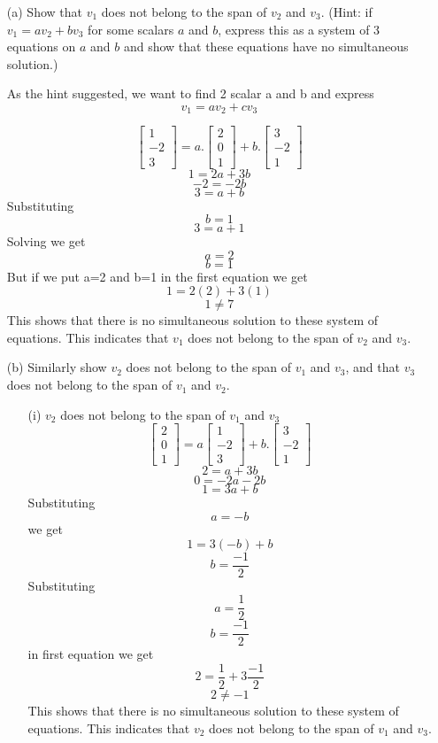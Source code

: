 \begin{enumerate}
    \item[(a)] Show that $v_1$ does not belong to the span of $v_2$ and $v_3$. (Hint: if $v_1 = a v_2 + b v_3$ for some scalars $a$ and $b$, express this as a system of 3 equations on $a$ and $b$ and show that these equations have no simultaneous solution.)

    As the hint suggested, we want to find 2 scalar a and b and express
    \[
    v_1=av_2+cv_3
    \]
   
    \[
\begin{bmatrix}
1 \\
-2 \\
3
\end{bmatrix} =
a .
\begin{bmatrix}
2 \\
0 \\
1
\end{bmatrix} + 
b .
\begin{bmatrix}
3 \\
-2 \\
1
\end{bmatrix}
\]
\[
1 = 2a + 3b
\]
\[
-2 = -2b
\]
\[
3 = a + b
\]
Substituting
\[
b=1
\]
\[
3 = a + 1
\]
Solving we get
\[
a = 2
\]
\[
b=1
\]
But if we put a=2 and b=1 in the first equation we get
\[
1 = 2(2) + 3(1) 
\]
\[
1 \neq 7
\]
This shows that there is no simultaneous solution to these system of equations.
This indicates that $v_1$ does not belong to the span of $v_2$ and $v_3$.
    
    
    
    
    \item[(b)] Similarly show $v_2$ does not belong to the span of $v_1$ and $v_3$, and that $v_3$ does not belong to the span of $v_1$ and $v_2$.

 \begin{enumerate}
     \item[(i)] $v_2$ does not belong to the span of $v_1$ and $v_3$ 
     \[
     \begin{bmatrix}
2 \\
0 \\
1
\end{bmatrix} = a \begin{bmatrix}
1 \\
-2 \\
3
\end{bmatrix} + b . \begin{bmatrix}
3 \\
-2 \\
1
\end{bmatrix}
     \]
     \[
     2 = a + 3b
     \]
      \[
     0 = -2a - 2b
     \]
      \[
     1 = 3a + b
     \]
     Substituting
     \[
     a = -b
     \]
     we get 
     \[
     1 = 3(-b)+b 
     \]
       \[
     b=\frac{-1}{2}
     \]
     Substituting 
     \[
     a = \frac{1}{2}
     \]
     \[
     b = \frac{-1}{2}
     \]
     in first equation we get
     \[
     2 = \frac{1}{2}+3\frac{-1}{2}
     \]
       \[
     2 \neq -1
     \]
     This shows that there is no simultaneous solution to these system of equations.
This indicates that $v_2$ does not belong to the span of $v_1$ and $v_3$.
     

\end{enumerate}
\end{enumerate}
